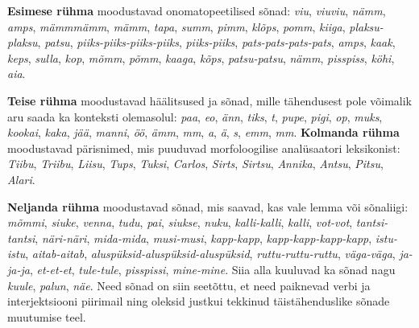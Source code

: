 \documentclass[12pt]{article}
\begin{document}
\textbf{Esimese rühma} moodustavad onomatopeetilised sõnad: \emph{viu}, \emph{viuviu}, \emph{nämm}, \emph{amps}, \emph{mämmmämm}, \emph{mämm}, \emph{tapa}, \emph{summ}, \emph{pimm}, \emph{klõps}, \emph{pomm}, \emph{kiiga}, \emph{plaksu-plaksu}, \emph{patsu}, \emph{piiks-piiks-piiks-piiks}, \emph{piiks-piiks}, \emph{pats-pats-pats-pats}, \emph{amps}, \emph{kaak}, \emph{keps}, \emph{sulla}, \emph{kop}, \emph{mõmm}, \emph{põmm}, \emph{kaaga}, \emph{kõps}, \emph{patsu-patsu}, \emph{nämm}, \emph{pisspiss}, \emph{köhi}, \emph{aia}. 


\textbf{Teise rühma} moodustavad häälitsused ja sõnad, mille tähendusest pole võimalik aru saada ka konteksti olemasolul: \emph{paa}, \emph{eo}, \emph{änn}, \emph{tiks}, \emph{t}, \emph{pupe}, \emph{pigi}, \emph{op}, \emph{muks}, \emph{kookai}, \emph{kaka}, \emph{jää}, \emph{manni}, \emph{öö}, \emph{ämm}, \emph{mm}, \emph{a}, \emph{ä}, \emph{s}, \emph{emm}, \emph{mm}. \textbf{Kolmanda rühma} moodustavad pärisnimed, mis puuduvad morfoloogilise analüsaatori leksikonist: \emph{Tiibu}, \emph{Triibu}, \emph{Liisu}, \emph{Tups}, \emph{Tuksi}, \emph{Carlos}, \emph{Sirts}, \emph{Sirtsu}, \emph{Annika}, \emph{Antsu}, \emph{Pitsu}, \emph{Alari}.

\textbf{Neljanda rühma} moodustavad sõnad, mis saavad, kas vale lemma või sõnaliigi: 
\emph{mõmmi}, \emph{siuke}, \emph{venna}, \emph{tudu}, \emph{pai}, \emph{siukse}, \emph{nuku}, \emph{kalli-kalli}, \emph{kalli}, \emph{vot-vot}, \emph{tantsi-tantsi}, \emph{näri-näri}, \emph{mida-mida}, \emph{musi-musi}, \emph{kapp-kapp}, \emph{kapp-kapp-kapp-kapp}, \emph{istu-istu}, \emph{aitab-aitab}, \emph{aluspüksid-aluspüksid-aluspüksid}, \emph{ruttu-ruttu-ruttu}, \emph{väga-väga}, \emph{ja-ja-ja}, \emph{et-et-et}, \emph{tule-tule}, \emph{pisspissi}, \emph{mine-mine}. Siia alla kuuluvad ka sõnad nagu \emph{kuule}, \emph{palun}, \emph{näe}. Need sõnad on siin seetõttu, et need paiknevad verbi ja interjektsiooni piirimail ning oleksid justkui tekkinud täistähenduslike sõnade muutumise teel. 
\end{document}
